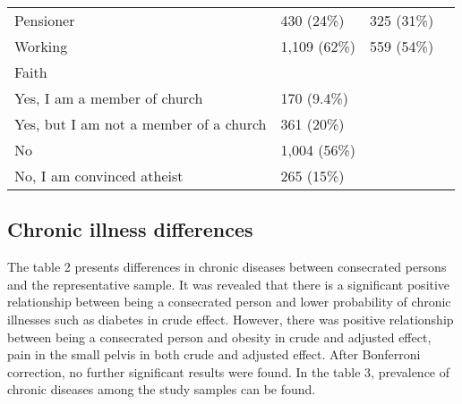 \documentclass[ijerph,article,accept,moreauthors,pdftex]{mdpi}
\begin{document}
\begin{table}
{\begin{tabular}[t]{llll}
\hspace{1em}Pensioner & 430 (24\%) & 325 (31\%) & \\
\hspace{1em}Working & 1,109 (62\%) & 559 (54\%) & \\
Faith &  &  & \\
\hspace{1em}Yes, I am a member of church & 170 (9.4\%) &  & \\
\addlinespace
\hspace{1em}Yes, but I am not a member of a church & 361 (20\%) &  & \\
\hspace{1em}No & 1,004 (56\%) &  & \\
\hspace{1em}No, I am convinced atheist & 265 (15\%) &  & \\
\bottomrule
\end{tabular}}
\end{table}

\newpage

\hypertarget{chronic-illness-differences}{%
\subsection{Chronic illness
differences}\label{chronic-illness-differences}}

The table 2 presents differences in chronic diseases between consecrated
persons and the representative sample. It was revealed that there is a
significant positive relationship between being a consecrated person and
lower probability of chronic illnesses such as diabetes in crude effect.
However, there was positive relationship between being a consecrated
person and obesity in crude and adjusted effect, pain in the small
pelvis in both crude and adjusted effect. After Bonferroni correction,
no further significant results were found. In the table 3, prevalence of
chronic diseases among the study samples can be found.
\end{document}
